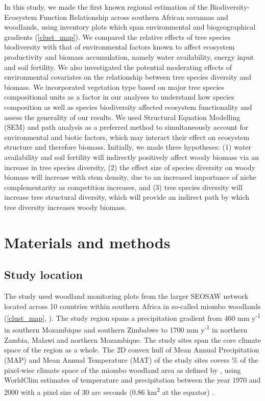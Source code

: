 \documentclass[11pt,a4paper]{article}
\newcommand{\textapprox}{\raisebox{0.5ex}{\texttildelow}}  %
\begin{document}
In this study, we made the first known regional estimation of the Biodiversity-Ecosystem Function Relationship across southern African savannas and woodlands, using inventory plots which span environmental and biogeographical gradients (\autoref{clust_map}). We compared the relative effects of tree species biodiversity with that of environmental factors known to affect ecosystem productivity and biomass accumulation, namely water availability, energy input and soil fertility. We also investigated the potential moderating effects of environmental covariates on the relationship between tree species diversity and biomass. We incorporated vegetation type based on major tree species compositional units as a factor in our analyses to understand how species composition as well as species biodiversity affected ecosystem functionality and assess the generality of our results. We used Structural Equation Modelling (SEM) and path analysis as a preferred method to simultaneously account for environmental and biotic factors, which may interact their effect on ecosystem structure and therefore biomass. Initially, we made three hypotheses: (1) water availability and soil fertility will indirectly positively affect woody biomass via an increase in tree species diversity, (2) the effect size of species diversity on woody biomass will increase with stem density, due to an increased importance of niche complementarity as competition increases, and (3) tree species diversity will increase tree structural diversity, which will provide an indirect path by which tree diversity increases woody biomass.

\section*{Materials and methods}

\subsection*{Study location}

The study used \nplots{} woodland monitoring plots from the larger SEOSAW network \citep{seosaw_web} located across 10 countries within southern Africa in so-called miombo woodlands (\autoref{clust_map}, \citealt{White1983}). The study region spans a precipitation gradient from \textapprox{}460 mm y\textsuperscript{-1} in southern Mozambique and southern Zimbabwe to \textapprox{}1700 mm y\textsuperscript{-1} in northern Zambia, Malawi and northern Mozambique. The study sites span the core climate space of the region as a whole. The 2D convex hull of Mean Annual Precipitation (MAP) and Mean Annual Temperature (MAT) of the study sites covers \hullcover{}\% of the pixel-wise climate space of the miombo woodland area as defined by \citet{White1983}, using WorldClim estimates of temperature and precipitation between the year 1970 and 2000 with a pixel size of 30 arc seconds (0.86 km\textsuperscript{2} at the equator) \citep{Fick2017}. 
\end{document}
